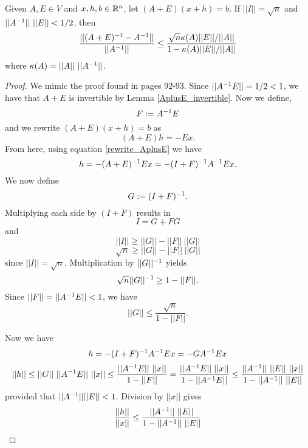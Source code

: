 \documentclass[letterpaper,titlepage]{article}
\begin{document}
\begin{lem}
    Given $A,E \in V$ and $x,h,b \in \mathbb{R}^n$, let $(A+E)(x+h)=b$. If $||I||=\sqrt{n}$ and $||A^{-1}||\ ||E||<1/2$, then
    $$\frac{||(A+E)^{-1}-A^{-1}||}{||A^{-1}||}\leq\frac{\sqrt{n}\kappa(A)||E||/||A||}{1-\kappa(A)||E||/||A||}$$   
    where $\kappa(A) = ||A||\ ||A\inv||$.
\end{lem}
\begin{proof}
    We mimic the proof found in \cite{Wilkinson} pages 92-93. Since $||A^{-1} E||=1/2<1$, we have that $A+E$ is invertible by Lemma \ref{AplusE_invertible}. Now we define,
    $$F:=A^{-1} E$$
    and we rewrite $(A+E)(x+h)=b$ as
    $$(A+E)h=-Ex.$$
    From here, using equation \ref{rewrite_AplusE} we have
    $$h = -(A+E)^{-1} Ex = -(I+F)^{-1} A^{-1} Ex.$$
    We now define
    $$G:=(I+F)^{-1}.$$
    Multiplying each side by $(I+F)$ results in
    $$I = G+FG$$
    and
    $$||I|| \geq ||G||-||F||\ ||G||$$
    $$\sqrt{n} \geq ||G|| -||F||\ ||G||$$
    since $||I||=\sqrt{n}$. Multiplication by $||G||^{-1}$ yields
    $$\sqrt{n}||G||^{-1} \geq 1-||F||.$$
    Since $||F||=||A^{-1} E|| <1$, we have
    $$||G|| \leq \frac{\sqrt{n}}{1-||F||}.$$

    Now we have
    $$h = -(I+F)^{-1} A^{-1} Ex= -GA^{-1} Ex$$
    $$||h|| \leq ||G||\ ||A\inv E||\ ||x|| \leq \frac{||A\inv E||\ ||x||}{1-||F||} = \frac{||A\inv E||\ ||x||}{1-||A\inv E||} \leq \frac{||A\inv||\ ||E||\ ||x||}{1-||A\inv||\ ||E||}$$
    provided that $||A^{-1}|| ||E|| < 1$.
    Division by $||x||$ gives
    $$\frac{||h||}{||x||}\leq \frac{||A^{-1}||\ ||E||}{1-||A^{-1}||\ ||E||}$$

\end{proof}
\end{document}
